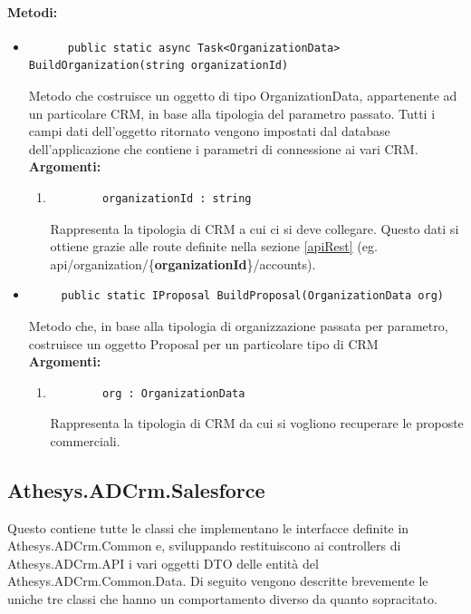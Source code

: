 \paragraph{Metodi:}\hfill
\begin{itemize}
	\itemsep0em 
	\item 
	\begin{lstlisting}
	  public static async Task<OrganizationData> BuildOrganization(string organizationId)	
	\end{lstlisting}
	Metodo che costruisce un oggetto di tipo OrganizationData, appartenente ad un particolare CRM, in base alla tipologia del parametro passato.
	Tutti i campi dati dell'oggetto ritornato vengono impostati dal database dell'applicazione che contiene i parametri di connessione ai vari CRM.
	\\
	\textbf{\small Argomenti:}
	\begin{enumerate}[leftmargin=*]
		\itemsep0em 
		\item 
		\begin{lstlisting}
		organizationId : string
		\end{lstlisting}
		Rappresenta la tipologia di CRM a cui ci si deve collegare. Questo dati si ottiene grazie alle route definite nella sezione \ref{apiRest} (eg. api/organization/\{\textbf{organizationId}\}/accounts).
	\end{enumerate}
	
	\item 
	\begin{lstlisting}
     public static IProposal BuildProposal(OrganizationData org)
	\end{lstlisting}
	Metodo che, in base alla tipologia di organizzazione passata per parametro, costruisce un oggetto Proposal per un particolare tipo di CRM\\
	\textbf{\small Argomenti:}
	\begin{enumerate}[leftmargin=*]
		\itemsep0em
		\item 
		\begin{lstlisting}
		org : OrganizationData
		\end{lstlisting}
		Rappresenta la tipologia di CRM da cui si vogliono recuperare le proposte commerciali.
	\end{enumerate}
\end{itemize}
 
\subsection{Athesys.ADCrm.Salesforce}
Questo  contiene tutte le classi che implementano le interfacce definite in Athesys.ADCrm.Common e, sviluppando  restituiscono ai controllers di Athesys.ADCrm.API i vari oggetti DTO delle entità del  Athesys.ADCrm.Common.Data.
Di seguito vengono descritte brevemente le uniche tre classi che hanno un comportamento diverso da quanto sopracitato.

